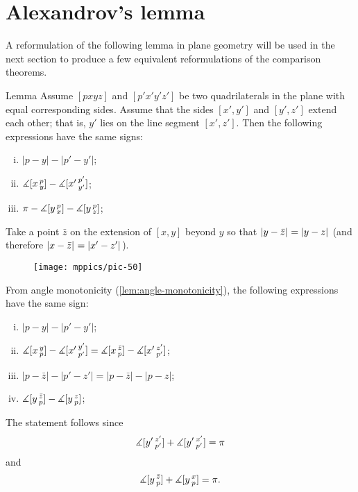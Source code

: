 \section{Alexandrov's lemma}

A reformulation of the following lemma in plane geometry will be used in the next section to produce a few equivalent reformulations of the comparison theorems.

\begin{thm}{Lemma}
\label{lem:alex}
Assume $[pxyz]$ and $[p'x'y'z']$ be two quadrilaterals in the plane with equal corresponding sides.
Assume that the sides $[x',y']$ and $[y',z']$ extend each other; that is, $y'$ lies on the line segment $[x',z']$.
Then the following expressions have the same signs:
\begin{enumerate}[(i)]
 \item $|p-y|-|p'-y'|$;
 \item $\measuredangle[x\,{}^{p}_{y}]-\measuredangle[x'\,{}^{p'}_{y'}]$;
 \item $\pi-\measuredangle[y\,{}^{p}_{x}]-\measuredangle[y\,{}^{p}_{z}]$;
\end{enumerate}
\end{thm}

Take 
a point $\bar z$ on the extension of 
$[x,y]$ beyond $y$ so that $\dist{y}{\bar z}{}=\dist{y}{z}{}$ (and therefore $\dist{x}{\bar z}{}=\dist{x'}{z'}{}$). 
 
\begin{figure}[h!]
\vskip-0mm
\centering
\texttt{[image: mppics/pic-50]}
\vskip-0mm
\end{figure}

From angle monotonicity (\ref{lem:angle-monotonicity}), 
the following expressions have the same sign:
\begin{enumerate}[(i)]
\item $|p-y|-|p'-y'|$;
\item $\measuredangle[x\,{}^{y}_{p}]-\measuredangle[x'\,{}^{y'}_{p'}]=\measuredangle[x\,{}^{\bar z}_{p}]-\measuredangle[x'\,{}^{z'}_{p'}]$;
\item $|p-\bar z|-|p'-z'| =  | p - \bar z  | - | p-z  | $;
\item $\measuredangle[y\,{}^{\bar z}_{p}]-\measuredangle[y\,{}^{z}_{p}]$;
\end{enumerate}
The statement follows since
\[\measuredangle[y'\,{}^{z'}_{p'}]+\measuredangle[y'\,{}^{x'}_{p'}]=\pi\]
and
\[\measuredangle[y\,{}^{\bar z}_{p}]+\measuredangle[y\,{}^{x}_{p}]=\pi.\]
\qedsf

